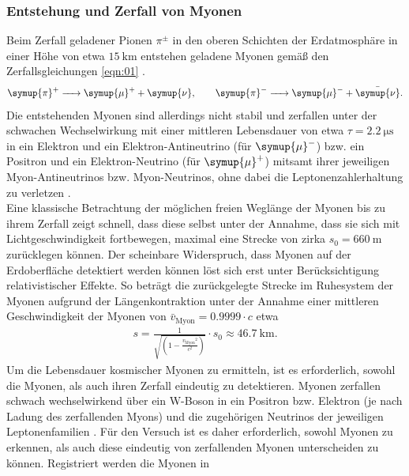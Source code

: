 \subsubsection{Entstehung und Zerfall von Myonen}
\noindent Beim Zerfall geladener Pionen $\pi^{\pm}$ in den oberen Schichten
der Erdatmosphäre in einer Höhe von etwa $\SI{15}{\kilo\meter}$ entstehen
geladene Myonen gemäß den Zerfallsgleichungen \ref{eqn:01} \cite{grupen}.
\begin{align}
  \ce{\symup{\pi}+ -> \symup{\mu}+ + \symup{\nu}}, \qquad
  \ce{\symup{\pi}- -> \symup{\mu}- + \bar{\symup{\nu}}}.
  \label{eqn:01}
\end{align}
\noindent Die entstehenden Myonen sind allerdings nicht stabil und zerfallen
unter der schwachen Wechselwirkung
mit einer mittleren Lebensdauer von etwa $\tau = \SI{2.2}{\micro\second}$ in
ein Elektron und ein Elektron-Antineutrino (für $\ce{\symup{\mu}- }$) bzw.
ein Positron und ein Elektron-Neutrino (für $\ce{\symup{\mu}+ }$) mitsamt ihrer
jeweiligen Myon-Antineutrinos bzw. Myon-Neutrinos, ohne dabei die
Leptonenzahlerhaltung zu verletzen \cite{grupen}. \\
\newline
\noindent Eine klassische Betrachtung der möglichen freien Weglänge der Myonen
bis zu ihrem Zerfall zeigt schnell, dass diese selbst unter der Annahme, dass
sie sich mit Lichtgeschwindigkeit fortbewegen, maximal eine Strecke von zirka
$s_0 = \SI{660}{\meter}$ zurücklegen können. Der scheinbare Widerspruch, dass Myonen
auf der Erdoberfläche detektiert werden können löst sich erst unter
Berücksichtigung relativistischer Effekte. So beträgt die zurückgelegte Strecke
im Ruhesystem der Myonen aufgrund der Längenkontraktion unter der Annahme einer
mittleren Geschwindigkeit der Myonen von $\bar{v}_\text{Myon} = 0.9999 \cdot c$
etwa
\begin{align}
s =\frac{1}{\sqrt{\left(1 - \frac{{v_\text{Myon}}^2}{c^2} \right)}} \cdot s_0 \approx \SI{46.7}{\kilo\meter}.
\label{eqn:02}
\end{align}
\noindent Um die Lebensdauer kosmischer Myonen zu ermitteln, ist es erforderlich,
sowohl die Myonen, als auch ihren Zerfall eindeutig zu detektieren. Myonen
zerfallen schwach wechselwirkend über ein W-Boson in ein Positron bzw. Elektron
(je nach Ladung des zerfallenden Myons) und die zugehörigen Neutrinos der
jeweiligen Leptonenfamilien \cite{grupen}. Für den Versuch ist es daher
erforderlich, sowohl Myonen zu erkennen, als auch diese eindeutig von
zerfallenden Myonen unterscheiden zu können. Registriert werden die Myonen in
